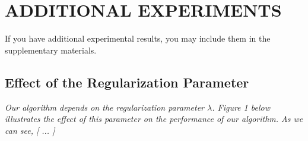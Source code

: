 \documentclass[twoside]{article}
\begin{document}
\section{ADDITIONAL EXPERIMENTS}

If you have additional experimental results, you may include them in the supplementary materials.

\subsection{Effect of the Regularization Parameter}

\textit{Our algorithm depends on the regularization parameter $\lambda$. Figure 1 below illustrates the effect of this parameter on the performance of our algorithm. As we can see, [ ... ]}

\vfill
\end{document}
